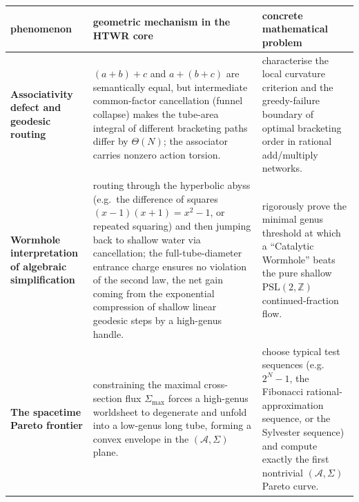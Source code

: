 \documentclass[11pt,a4paper]{article}
\theoremstyle{definition}
\theoremstyle{remark}
\newcommand{\ZZ}{\mathbb{Z}}
\newcommand{\cA}{\mathcal{A}}
\begin{document}
\begin{center}
\begin{tabularx}{\textwidth}{p{} p{} p{}}
\toprule
\textbf{phenomenon} & \textbf{geometric mechanism in the HTWR core} &
\textbf{concrete mathematical problem}\\
\midrule
\textbf{Associativity defect and geodesic routing}
& $(a+b)+c$ and $a+(b+c)$ are semantically equal, but intermediate common-factor
cancellation (funnel collapse) makes the tube-area integral of different
bracketing paths differ by $\Theta(N)$; the associator carries nonzero action
torsion.
& characterise the local curvature criterion and the greedy-failure boundary of
optimal bracketing order in rational add/multiply networks.\\
\addlinespace
\textbf{Wormhole interpretation of algebraic simplification}
& routing through the hyperbolic abyss (e.g.\ the difference of squares
$(x-1)(x+1) = x^2 - 1$, or repeated squaring) and then jumping back to shallow
water via cancellation; the full-tube-diameter entrance charge ensures no
violation of the second law, the net gain coming from the exponential compression
of shallow linear geodesic steps by a high-genus handle.
& rigorously prove the minimal genus threshold at which a ``Catalytic Wormhole''
beats the pure shallow $\mathrm{PSL}(2, \ZZ)$ continued-fraction flow.\\
\addlinespace
\textbf{The spacetime Pareto frontier}
& constraining the maximal cross-section flux $\Sigma_{\max}$ forces a
high-genus worldsheet to degenerate and unfold into a low-genus long tube, forming
a convex envelope in the $(\cA, \Sigma)$ plane.
& choose typical test sequences (e.g.\ $2^N - 1$, the Fibonacci
rational-approximation sequence, or the Sylvester sequence) and compute exactly
the first nontrivial $(\cA, \Sigma)$ Pareto curve.\\
\bottomrule
\end{tabularx}
\end{center}
\end{document}
